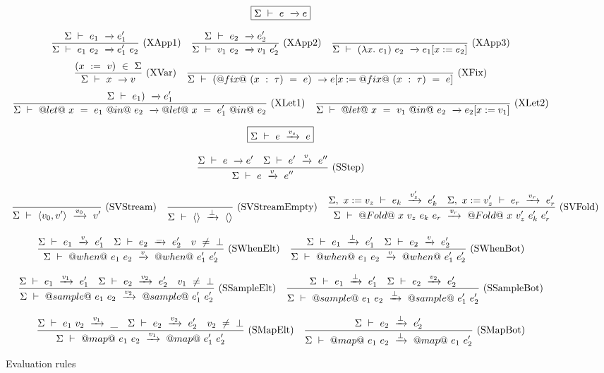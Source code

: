 
\begin{figure*}

$$
\boxed{\Sigma ~\vdash~ e ~\xrightarrow~ e}
$$

$$
\enskip \frac {\displaystyle 
    \Sigma ~\vdash~ e_1 ~\xrightarrow~ e_1'
} {\displaystyle 
    \Sigma ~\vdash~ e_1~e_2 ~\xrightarrow~ e_1'~e_2
} \  \mbox{(XApp1)} \enskip
\enskip \frac {\displaystyle 
    \Sigma ~\vdash~ e_2 ~\xrightarrow~ e_2'
} {\displaystyle 
    \Sigma ~\vdash~ v_1~e_2 ~\xrightarrow~ v_1~e_2'
} \  \mbox{(XApp2)} \enskip
\enskip \frac {\displaystyle } {\displaystyle 
    \Sigma ~\vdash~ (\lambda{}x.~e_1)~e_2 ~\xrightarrow~ e_1[x:=e_2]
} \  \mbox{(XApp3)} \enskip
$$
$$
\enskip \frac {\displaystyle 
    (x~:=~v)~\in~\Sigma
} {\displaystyle 
    \Sigma ~\vdash~ x ~\xrightarrow~ v
} \  \mbox{(XVar)} \enskip
\enskip \frac {\displaystyle } {\displaystyle 
    \Sigma ~\vdash~ (@fix@~(x~:~\tau)~=~e) ~\xrightarrow~ e[x:=@fix@~(x~:~\tau)~=~e]
} \  \mbox{(XFix)} \enskip
$$
$$
\enskip \frac {\displaystyle 
    \Sigma ~\vdash~ e_1) ~\xrightarrow~ e_1'
} {\displaystyle 
    \Sigma ~\vdash~ @let@~x~=~e_1~@in@~e_2 ~\xrightarrow~ @let@~x~=~e_1'~@in@~e_2
} \  \mbox{(XLet1)} \enskip
\enskip \frac {\displaystyle } {\displaystyle 
    \Sigma ~\vdash~ @let@~x~=~v_1~@in@~e_2 ~\xrightarrow~ e_2[x:=v_1]
} \  \mbox{(XLet2)} \enskip
$$

$$
\boxed{\Sigma ~\vdash~ e ~\xrightarrow{v_s}~ e}
$$

$$
\enskip \frac {\displaystyle 
    \Sigma ~\vdash~ e ~\xrightarrow~ e'
    \quad
    \Sigma ~\vdash~ e' ~\xrightarrow{v}~ e''
} {\displaystyle 
    \Sigma ~\vdash~ e ~\xrightarrow{v}~ e''
} \  \mbox{(SStep)} \enskip
$$

$$
\enskip \frac {\displaystyle } {\displaystyle 
    \Sigma ~\vdash~ \langle v_0, v' \rangle ~\xrightarrow{v_0}~ v'
} \  \mbox{(SVStream)} \enskip
\enskip \frac {\displaystyle } {\displaystyle 
    \Sigma ~\vdash~ \langle \rangle ~\xrightarrow{\bot}~ \langle \rangle
} \  \mbox{(SVStreamEmpty)} \enskip
\enskip \frac {\displaystyle 
    \Sigma,~x:=v_z ~\vdash~ e_k ~\xrightarrow{v_z'}~ e_k'
    \quad
    \Sigma,~x:=v_z' ~\vdash~ e_r ~\xrightarrow{v_r}~ e_r'
} {\displaystyle 
    \Sigma ~\vdash~ @Fold@~x~v_z~e_k~e_r ~\xrightarrow{v_r}~ @Fold@~x~v_z'~e_k'~e_r'
} \  \mbox{(SVFold)} \enskip
$$

$$
\enskip \frac {\displaystyle 
    \Sigma ~\vdash~ e_1 ~\xrightarrow{v}~ e_1'
    \quad
    \Sigma ~\vdash~ e_2 ~\xrightarrow{\_}~ e_2'
    \quad
    v~\not=~\bot
} {\displaystyle 
    \Sigma ~\vdash~ @when@~e_1~e_2 ~\xrightarrow{v}~ @when@~e_1'~e_2'
} \  \mbox{(SWhenElt)} \enskip
\enskip \frac {\displaystyle 
    \Sigma ~\vdash~ e_1 ~\xrightarrow{\bot}~ e_1'
    \quad
    \Sigma ~\vdash~ e_2 ~\xrightarrow{v}~ e_2'
} {\displaystyle 
    \Sigma ~\vdash~ @when@~e_1~e_2 ~\xrightarrow{v}~ @when@~e_1'~e_2'
} \  \mbox{(SWhenBot)} \enskip
$$

$$
\enskip \frac {\displaystyle 
    \Sigma ~\vdash~ e_1 ~\xrightarrow{v_1}~ e_1'
    \quad
    \Sigma ~\vdash~ e_2 ~\xrightarrow{v_2}~ e_2'
    \quad
    v_1~\not=~\bot
} {\displaystyle 
    \Sigma ~\vdash~ @sample@~e_1~e_2 ~\xrightarrow{v_2}~ @sample@~e_1'~e_2'
} \  \mbox{(SSampleElt)} \enskip
\enskip \frac {\displaystyle 
    \Sigma ~\vdash~ e_1 ~\xrightarrow{\bot}~ e_1'
    \quad
    \Sigma ~\vdash~ e_2 ~\xrightarrow{v_2}~ e_2'
} {\displaystyle 
    \Sigma ~\vdash~ @sample@~e_1~e_2 ~\xrightarrow{\bot}~ @sample@~e_1'~e_2'
} \  \mbox{(SSampleBot)} \enskip
$$

$$
\enskip \frac {\displaystyle 
    \Sigma ~\vdash~ e_1~v_2 ~\xrightarrow{v_1}~ \_
    \quad
    \Sigma ~\vdash~ e_2 ~\xrightarrow{v_2}~ e_2'
    \quad
    v_2~\not=~\bot
} {\displaystyle 
    \Sigma ~\vdash~ @map@~e_1~e_2 ~\xrightarrow{v_1}~ @map@~e_1'~e_2'
} \  \mbox{(SMapElt)} \enskip
\enskip \frac {\displaystyle 
    \Sigma ~\vdash~ e_2 ~\xrightarrow{\bot}~ e_2'
} {\displaystyle 
    \Sigma ~\vdash~ @map@~e_1~e_2 ~\xrightarrow{\bot}~ @map@~e_1~e_2'
} \  \mbox{(SMapBot)} \enskip
$$

\caption{Evaluation rules}
\label{fig:source:eval}
\end{figure*}


